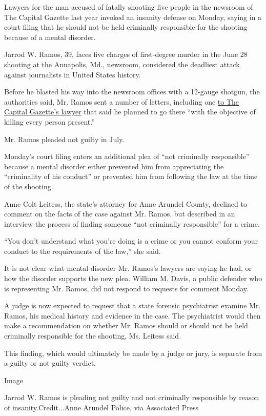 Lawyers for the man accused of fatally shooting five people in the
newsroom of The Capital Gazette last year invoked an insanity defense on
Monday, saying in a court filing that he should not be held criminally
responsible for the shooting because of a mental disorder.

Jarrod W. Ramos, 39, faces five charges of first-degree murder in the
June 28 shooting at the Annapolis, Md., newsroom, considered the
deadliest attack against journalists in United States history.

Before he blasted his way into the newsroom offices with a 12-gauge
shotgun, the authorities said, Mr. Ramos sent a number of letters,
including one
\href{https://www.nytimes3xbfgragh.onion/2018/07/02/us/annapolis-shooting-woman-harassed.html}{to
The Capital Gazette's lawyer} that said he planned to go there ``with
the objective of killing every person present.''

Mr. Ramos pleaded not guilty in July.

Monday's court filing enters an additional plea of ``not criminally
responsible'' because a mental disorder either prevented him from
appreciating the ``criminality of his conduct'' or prevented him from
following the law at the time of the shooting.

Anne Colt Leitess, the state's attorney for Anne Arundel County,
declined to comment on the facts of the case against Mr. Ramos, but
described in an interview the process of finding someone ``not
criminally responsible'' for a crime.

``You don't understand what you're doing is a crime or you cannot
conform your conduct to the requirements of the law,'' she said.

It is not clear what mental disorder Mr. Ramos's lawyers are saying he
had, or how the disorder supports the new plea. William M. Davis, a
public defender who is representing Mr. Ramos, did not respond to
requests for comment Monday.

A judge is now expected to request that a state forensic psychiatrist
examine Mr. Ramos, his medical history and evidence in the case. The
psychiatrist would then make a recommendation on whether Mr. Ramos
should or should not be held criminally responsible for the shooting,
Ms. Leitess said.

This finding, which would ultimately be made by a judge or jury, is
separate from a guilty or not guilty verdict.

Image

Jarrod W. Ramos is pleading not guilty and not criminally responsible by
reason of insanity.Credit...Anne Arundel Police, via Associated Press

